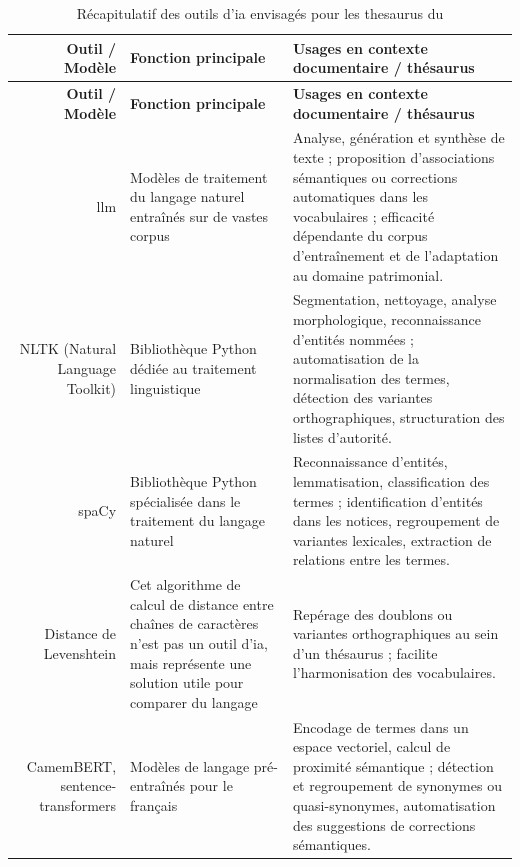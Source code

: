 \begin{longtable}{D E E}
	\caption{Récapitulatif des outils d'\ac{ia} envisagés pour les \gls{thesaurus} du \mae}
	\label{tab:recapIA}\\
	\hline\hline
	\textbf{Outil / Modèle} & \textbf{Fonction principale} & \textbf{Usages en contexte documentaire / thésaurus} \\
	\hline
	\endfirsthead
	
	\hline\hline
	\textbf{Outil / Modèle} & \textbf{Fonction principale} & \textbf{Usages en contexte documentaire / thésaurus} \\
	\hline
	\endhead
	
	\hline
	\endfoot
	
	\hline\hline
	\endlastfoot
	
	\ac{llm} & Modèles de traitement du langage naturel entraînés sur de vastes corpus & Analyse, génération et synthèse de texte ; proposition d’associations sémantiques ou corrections automatiques dans les vocabulaires ; efficacité dépendante du corpus d’entraînement et de l’adaptation au domaine patrimonial. \\
	NLTK (Natural Language Toolkit) & Bibliothèque Python dédiée au traitement linguistique & Segmentation, nettoyage, analyse morphologique, reconnaissance d’entités nommées ; automatisation de la normalisation des termes, détection des variantes orthographiques, structuration des listes d’autorité. \\
	spaCy & Bibliothèque Python spécialisée dans le traitement du langage naturel & Reconnaissance d’entités, lemmatisation, classification des termes ; identification d’entités dans les notices, regroupement de variantes lexicales, extraction de relations entre les termes. \\
	Distance de Levenshtein & Cet algorithme de calcul de distance entre chaînes de caractères  n'est pas un outil d'\ac{ia}, mais représente une solution utile pour comparer du langage & Repérage des doublons ou variantes orthographiques au sein d’un thésaurus ; facilite l’harmonisation des vocabulaires. \\
	CamemBERT, sentence-transformers & Modèles de langage pré-entraînés pour le français & Encodage de termes dans un espace vectoriel, calcul de proximité sémantique ; détection et regroupement de synonymes ou quasi-synonymes, automatisation des suggestions de corrections sémantiques. \\
\end{longtable}